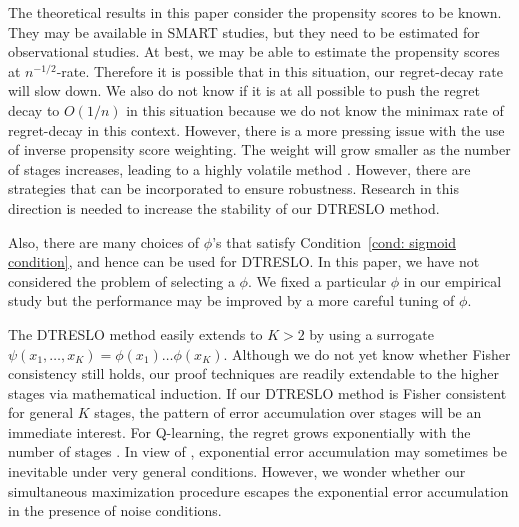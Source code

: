 \documentclass[preprint] {imsart}
\begin{document}
  
  The theoretical results in this paper consider the propensity scores to be known. They may be available in SMART studies, but they need to be estimated for observational studies. At best, we may be able to estimate the propensity scores at $n^{-1/2}$-rate. Therefore it is possible that in this situation,  our regret-decay rate will slow down. We also do not know if it is at all possible to push the regret decay to $O(1/n)$ in this situation because we do not know the minimax rate of regret-decay in this context. However, there is a more pressing issue with the use of inverse propensity score weighting. The weight will grow smaller as the number of stages increases, leading to a highly  volatile method \citep{laber2019}. However, there are strategies \citep{kallus2018} that can be incorporated to ensure robustness. Research in this direction is needed to increase the stability of our DTRESLO method. 
  
  Also, there are many choices of  $\phi$'s that satisfy Condition~\ref{cond: sigmoid  condition}, and hence can be used for DTRESLO.  In this paper, we have not considered the problem of selecting a $\phi$. We fixed a particular $\phi$ in our empirical study but the performance may be improved by a more careful tuning of $\phi$. 
  
  The DTRESLO method easily extends to $K > 2$ by using a surrogate $\psi(x_1,\ldots,x_K)=\phi(x_1)\ldots\phi(x_K)$. Although we do not yet know whether  Fisher consistency still holds, our proof techniques are readily extendable to the higher stages via mathematical induction. If our DTRESLO method is Fisher consistent for general $K$ stages,  the pattern of error accumulation over stages will be an immediate interest. For Q-learning, the regret grows exponentially with the number of stages \citep{murphy2005}.  In view of \cite{wang2020statistical},  exponential error accumulation may sometimes be inevitable under very  general  conditions. However,  we wonder whether our simultaneous maximization procedure escapes the exponential error accumulation in the presence of noise conditions.
  
  
  
\end{document}
